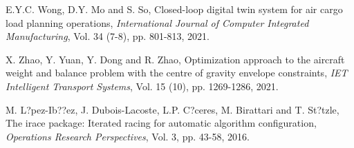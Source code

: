 \documentclass[preprint]{elsarticle}
\begin{document}
\begin{thebibliography}{00}
 E.Y.C. Wong, D.Y. Mo and S. So, Closed-loop digital twin system for air cargo load planning operations, {\it International Journal of Computer Integrated Manufacturing}, Vol. 34 (7-8), pp. 801-813, 2021.

 X. Zhao, Y. Yuan, Y. Dong and R. Zhao, Optimization approach to the aircraft weight and balance problem with the centre of gravity envelope constraints, {\it IET Intelligent Transport Systems}, Vol. 15 (10), pp. 1269-1286, 2021.

 M. L?pez-Ib??ez, J. Dubois-Lacoste, L.P. C?ceres, M. Birattari and T. St?tzle, The irace package: Iterated racing for automatic algorithm configuration, {\it Operations Research Perspectives}, Vol. 3, pp. 43-58, 2016.


\end{thebibliography}
\end{document}
